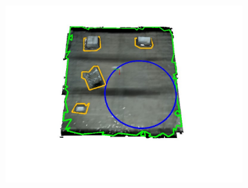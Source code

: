 \begin{figure}[!htb]
\begin{subfigure}[t]{.28\linewidth}
    \caption{\label{fig:ch7_flight_mesh_b}}
  \end{subfigure}
  \begin{subfigure}[t]{.28\linewidth}
    \centering  \includegraphics[page=3,clip,trim=3.5cm 3cm 3.5cm 1.4cm,width=.99\linewidth]{chapter_7_experiments/imgs/mesh_flight.pdf}
    \caption{\label{fig:ch7_flight_mesh_c}}
  \end{subfigure}
  

\end{figure}
